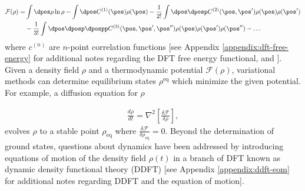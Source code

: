 \begin{align}\label{eqn:dft-free-energy-functional}
\mathcal{F}(\rho) = &\int \dpos \rho \ln{\rho} - \int \dpos C^{(1)}(\pos) \rho(\pos) - \frac{1}{2!} \int \dpos \dposp C^{(2)}(\pos, \pos') \rho(\pos) \rho(\pos') \\
    &- \frac{1}{3!} \int \dpos \dposp \dpospp C^{(3)}(\pos, \pos', \pos'') \rho(\pos) \rho(\pos') \rho(\pos'') - \ldots \nonumber
\end{align}
%
%
where $c^{(n)}$ are $n$-point correlation functions [see Appendix \ref{appendix:dft-free-energy} for additional notes regarding the DFT free energy functional, and \cite{te2020classical, laird1992crystal}].  Given a density field $\rho$ and a thermodynamic potential $\mathcal{F}(\rho)$, variational methods can determine equilibrium states $\rho^{\text{eq}}$ which minimize the given potential.  For example, a diffusion equation for $\rho$

\begin{align}
\frac{d\rho}{dt} = \nabla^2 \left[ \frac{\delta \mathcal{F}}{\delta \rho} \right],
\end{align}
%
evolves $\rho$ to a stable point $\rho_\text{eq}$ where $\frac{\delta \mathcal{F}}{\delta \rho_\text{eq}} = 0$.  Beyond the determination of ground states, questions about dynamics have been addressed by introducing equations of motion of the density field $\rho(t)$ in a branch of DFT known as dynamic density functional theory (DDFT) [see Appendix \ref{appendix:ddft-eom} for additional notes regarding DDFT and the equation of motion].

